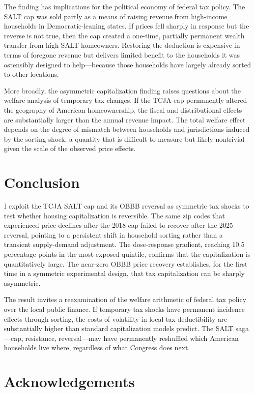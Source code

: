 \documentclass[12pt]{article}
\begin{document}
The finding has implications for the political economy of federal tax policy. The SALT cap was sold partly as a means of raising revenue from high-income households in Democratic-leaning states. If prices fell sharply in response but the reverse is not true, then the cap created a one-time, partially permanent wealth transfer from high-SALT homeowners. Restoring the deduction is expensive in terms of foregone revenue but delivers limited benefit to the households it was ostensibly designed to help---because those households have largely already sorted to other locations.

More broadly, the asymmetric capitalization finding raises questions about the welfare analysis of temporary tax changes. If the TCJA cap permanently altered the geography of American homeownership, the fiscal and distributional effects are substantially larger than the annual revenue impact. The total welfare effect depends on the degree of mismatch between households and jurisdictions induced by the sorting shock, a quantity that is difficult to measure but likely nontrivial given the scale of the observed price effects.

\section{Conclusion}

I exploit the TCJA SALT cap and its OBBB reversal as symmetric tax shocks to test whether housing capitalization is reversible. The same zip codes that experienced price declines after the 2018 cap failed to recover after the 2025 reversal, pointing to a persistent shift in household sorting rather than a transient supply-demand adjustment. The dose-response gradient, reaching 10.5 percentage points in the most-exposed quintile, confirms that the capitalization is quantitatively large. The near-zero OBBB price recovery establishes, for the first time in a symmetric experimental design, that tax capitalization can be sharply asymmetric.

The result invites a reexamination of the welfare arithmetic of federal tax policy over the local public finance. If temporary tax shocks have permanent incidence effects through sorting, the costs of volatility in local tax deductibility are substantially higher than standard capitalization models predict. The SALT saga---cap, resistance, reversal---may have permanently reshuffled which American households live where, regardless of what Congress does next.

\section*{Acknowledgements}
\end{document}
